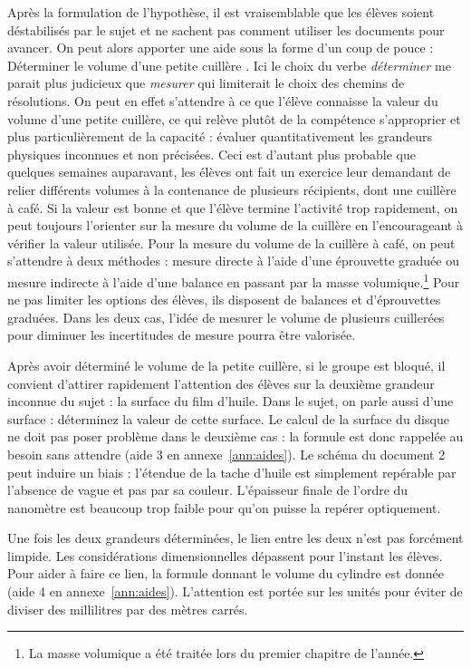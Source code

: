 \documentclass[12pt,a4paper, fleqn]{report}
\begin{document}
Après la formulation de l'hypothèse, il est vraisemblable que les élèves soient déstabilisés par le sujet et ne sachent pas comment utiliser les documents pour avancer.
On peut alors apporter une aide sous la forme d'un coup de pouce : \og Déterminer le volume d'une petite cuillère \fg{}.
Ici le choix du verbe \emph{déterminer} me parait plus judicieux que \emph{mesurer} qui limiterait le choix des chemins de résolutions.
On peut en effet s'attendre à ce que l'élève connaisse la valeur du volume d'une petite cuillère, ce qui relève plutôt de la compétence s'approprier et plus particulièrement de la capacité : évaluer quantitativement les grandeurs physiques inconnues et non précisées.
Ceci est d'autant plus probable que quelques semaines auparavant, les élèves ont fait un exercice leur demandant de relier différents volumes à la contenance de plusieurs récipients, dont une cuillère à café.
Si la valeur est bonne et que l'élève termine l'activité trop rapidement, on peut toujours l'orienter sur la mesure du volume de la cuillère en l'encourageant à vérifier la valeur utilisée.
Pour la mesure du volume de la cuillère à café, on peut s'attendre à deux méthodes : mesure \og directe \fg{} à l'aide d'une éprouvette graduée ou mesure \og indirecte \fg{} à l'aide d'une balance en passant par la masse volumique.\footnote{La masse volumique a été traitée lors du premier chapitre de l'année.}
Pour ne pas limiter les options des élèves, ils disposent de balances et d'éprouvettes graduées.
Dans les deux cas, l'idée de mesurer le volume de plusieurs cuillerées pour diminuer les incertitudes de mesure pourra être valorisée.

Après avoir déterminé le volume de la petite cuillère, si le groupe est bloqué, il convient d'attirer rapidement l'attention des élèves sur la deuxième grandeur inconnue du sujet : la surface du film d'huile.
\og Dans le sujet, on parle aussi d'une surface : déterminez la valeur de cette surface.\fg{} 
Le calcul de la surface du disque ne doit pas poser problème dans le deuxième cas : la formule est donc rappelée au besoin sans attendre (aide 3 en annexe~\ref{ann:aides}).
Le schéma du document 2 peut induire un biais : l'étendue de la tache d'huile est simplement repérable par l'absence de vague et pas par sa couleur.
L'épaisseur finale de l'ordre du nanomètre est beaucoup trop faible pour qu'on puisse la repérer optiquement.

Une fois les deux grandeurs déterminées, le lien entre les deux n'est pas forcément limpide.
Les considérations dimensionnelles dépassent pour l'instant les élèves.
Pour aider à faire ce lien, la formule donnant le volume du cylindre est donnée (aide 4 en annexe~\ref{ann:aides}).
L'attention est portée sur les unités pour éviter de diviser des millilitres par des mètres carrés.
\end{document}
